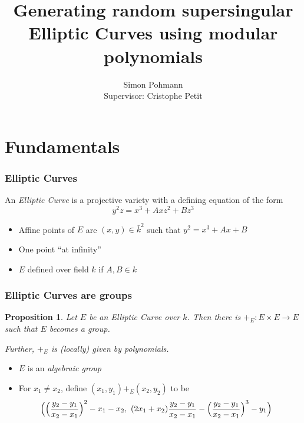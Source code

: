 \documentclass{beamer}
\title{Generating random supersingular Elliptic Curves using modular polynomials}
\author{Simon Pohmann\\Supervisor: Cristophe Petit}
\newtheorem{proposition}{Proposition}
\begin{document}
\maketitle

\section{Fundamentals}

\begin{frame}
    \frametitle{Elliptic Curves}
    \begin{definition}
        An \emph{Elliptic Curve} is a projective variety with a defining equation of the form
        \begin{equation*}
            y^2 z = x^3 + Ax z^2 + B z^3
        \end{equation*}
    \end{definition}
    \begin{itemize}[<+->]
        \item Affine points of $E$ are $(x, y) \in \bar{k}^2$ such that $y^2 = x^3 + Ax + B$
        \item One point ``at infinity''
        \item $E$ defined over field $k$ if $A, B \in k$
    \end{itemize}
\end{frame}

\begin{frame}
    \frametitle{Elliptic Curves are groups}

    \begin{proposition}
        Let $E$ be an Elliptic Curve over $k$.
        Then there is $+_E: E \times E \to E$ such that $E$ becomes a group.

        Further, $+_E$ is (locally) given by polynomials.
    \end{proposition}
    \begin{itemize}[<+->]
        \item $E$ is an \emph{algebraic group}
        \item For $x_1 \neq x_2$, define $(x_1, y_1) +_E (x_2, y_2)$ to be
        \begin{align*}
            &\Bigl( \Bigl(\frac {y_2 - y_1} {x_2 - x_1}\Bigr)^2 - x_1 - x_2, \ (2x_1 + x_2)\frac {y_2 - y_1} {x_2 - x_1} - \Bigl(\frac {y_2 - y_1} {x_2 - x_1}\Bigr)^3 - y_1 \Bigr)
        \end{align*}
    \end{itemize}
\end{frame}
\end{document}
